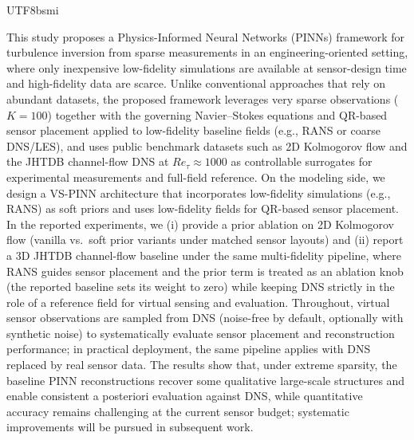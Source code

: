 \documentclass[master]{NTHUthesis}
\begin{document}
\begin{CJK*}{UTF8}{bsmi}
\begin{abstractEN}
This study proposes a Physics-Informed Neural Networks (PINNs) framework for turbulence inversion from sparse measurements in an engineering-oriented setting, where only inexpensive low-fidelity simulations are available at sensor-design time and high-fidelity data are scarce.
Unlike conventional approaches that rely on abundant datasets, the proposed framework leverages very sparse observations ($K = 100$) together with the governing Navier--Stokes equations and QR-based sensor placement applied to low-fidelity baseline fields (e.g., RANS or coarse DNS/LES), and uses public benchmark datasets such as 2D Kolmogorov flow and the JHTDB channel-flow DNS at $Re_\tau \approx 1000$ as controllable surrogates for experimental measurements and full-field reference.
On the modeling side, we design a VS-PINN architecture that incorporates low-fidelity simulations (e.g., RANS) as soft priors and uses low-fidelity fields for QR-based sensor placement. In the reported experiments, we (i) provide a prior ablation on 2D Kolmogorov flow (vanilla vs.\ soft prior variants under matched sensor layouts) and (ii) report a 3D JHTDB channel-flow baseline under the same multi-fidelity pipeline, where RANS guides sensor placement and the prior term is treated as an ablation knob (the reported baseline sets its weight to zero) while keeping DNS strictly in the role of a reference field for virtual sensing and evaluation.
Throughout, virtual sensor observations are sampled from DNS (noise-free by default, optionally with synthetic noise) to systematically evaluate sensor placement and reconstruction performance; in practical deployment, the same pipeline applies with DNS replaced by real sensor data.
The results show that, under extreme sparsity, the baseline PINN reconstructions recover some qualitative large-scale structures and enable consistent a posteriori evaluation against DNS, while quantitative accuracy remains challenging at the current sensor budget; systematic improvements will be pursued in subsequent work.
\end{abstractEN}


\begingroup
\sloppy
{}
\hfuzz=10pt
\vfuzz=10pt
\maketoc
\endgroup


\end{CJK*}
\end{document}
